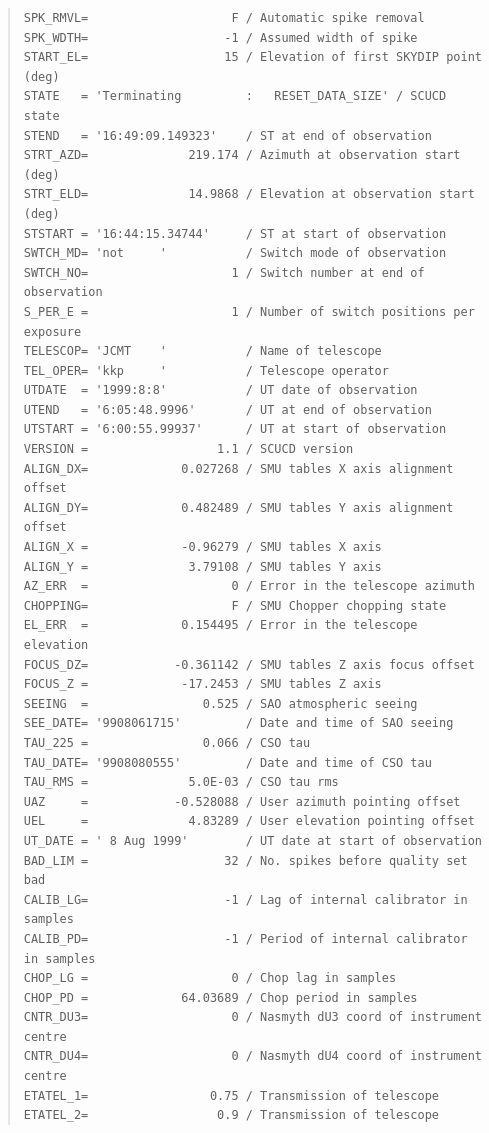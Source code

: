 \documentclass[twoside,11pt]{article}
\newenvironment{myquote}{\begin{quote}\begin{small}}{\end{small}\end{quote}}
\renewcommand{\_}{\texttt{\symbol{95}}}
\begin{document}
\begin{myquote}
\begin{verbatim}
SPK_RMVL=                    F / Automatic spike removal
SPK_WDTH=                   -1 / Assumed width of spike
START_EL=                   15 / Elevation of first SKYDIP point (deg)
STATE   = 'Terminating         :   RESET_DATA_SIZE' / SCUCD state
STEND   = '16:49:09.149323'    / ST at end of observation
STRT_AZD=              219.174 / Azimuth at observation start (deg)
STRT_ELD=              14.9868 / Elevation at observation start (deg)
STSTART = '16:44:15.34744'     / ST at start of observation
SWTCH_MD= 'not     '           / Switch mode of observation
SWTCH_NO=                    1 / Switch number at end of observation
S_PER_E =                    1 / Number of switch positions per exposure
TELESCOP= 'JCMT    '           / Name of telescope
TEL_OPER= 'kkp     '           / Telescope operator
UTDATE  = '1999:8:8'           / UT date of observation
UTEND   = '6:05:48.9996'       / UT at end of observation
UTSTART = '6:00:55.99937'      / UT at start of observation
VERSION =                  1.1 / SCUCD version
ALIGN_DX=             0.027268 / SMU tables X axis alignment offset
ALIGN_DY=             0.482489 / SMU tables Y axis alignment offset
ALIGN_X =             -0.96279 / SMU tables X axis
ALIGN_Y =              3.79108 / SMU tables Y axis
AZ_ERR  =                    0 / Error in the telescope azimuth
CHOPPING=                    F / SMU Chopper chopping state
EL_ERR  =             0.154495 / Error in the telescope elevation
FOCUS_DZ=            -0.361142 / SMU tables Z axis focus offset
FOCUS_Z =             -17.2453 / SMU tables Z axis
SEEING  =                0.525 / SAO atmospheric seeing
SEE_DATE= '9908061715'         / Date and time of SAO seeing
TAU_225 =                0.066 / CSO tau
TAU_DATE= '9908080555'         / Date and time of CSO tau
TAU_RMS =              5.0E-03 / CSO tau rms
UAZ     =            -0.528088 / User azimuth pointing offset
UEL     =              4.83289 / User elevation pointing offset
UT_DATE = ' 8 Aug 1999'        / UT date at start of observation
BAD_LIM =                   32 / No. spikes before quality set bad
CALIB_LG=                   -1 / Lag of internal calibrator in samples
CALIB_PD=                   -1 / Period of internal calibrator in samples
CHOP_LG =                    0 / Chop lag in samples
CHOP_PD =             64.03689 / Chop period in samples
CNTR_DU3=                    0 / Nasmyth dU3 coord of instrument centre
CNTR_DU4=                    0 / Nasmyth dU4 coord of instrument centre
ETATEL_1=                 0.75 / Transmission of telescope
ETATEL_2=                  0.9 / Transmission of telescope

\end{verbatim}
\end{myquote}
\end{document}
